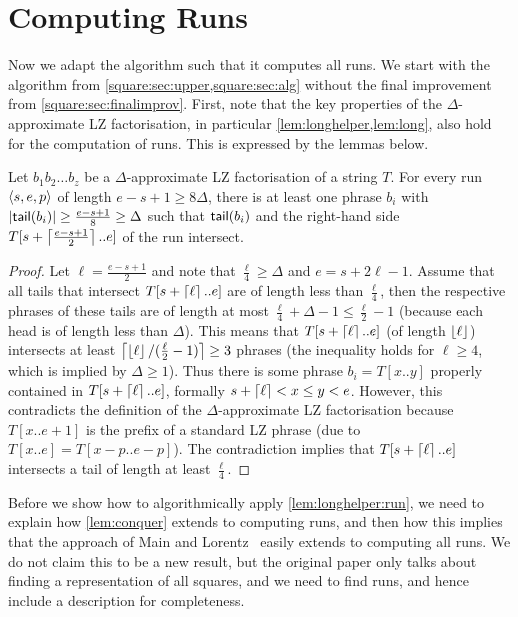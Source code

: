 \section{Computing Runs}\label{square:sec:runs}

Now we adapt the algorithm such that it computes all runs. We start with the algorithm from \cref{square:sec:upper,square:sec:alg} without the final improvement from \cref{square:sec:finalimprov}. First, note that the key properties of the $\Delta$-approximate LZ factorisation, in particular \cref{lem:longhelper,lem:long}, also hold for the computation of runs. This is expressed by the lemmas below.

\begin{lemma}
\label{lem:longhelper:run}
Let $b_{1}b_{2}\ldots b_{z}$ be a $\Delta$-approximate LZ factorisation of a string $T$. For every run $\left\langle s,e,p\right\rangle$ of length $e-s+1 \geq 8\Delta$, there is at least one phrase $b_i$ with $\left\lvert\textsf{tail}(b_i)\right\rvert \geq \frac {e-s+1} 8 \geq \Delta$ such that $\textsf{tail}(b_i)$ and the right-hand side $T[s + \left\lceil\frac{e - s + 1} 2\right\rceil..e]$ of the run intersect.
\end{lemma}
\begin{proof}
Let $\ell = \frac {e-s+1} 2$ and note that $\frac \ell 4 \geq \Delta$ and $e = s+2\ell - 1$. Assume that all tails that intersect $T[s + \left\lceil\ell\right\rceil..e]$ are of length less than $\frac \ell 4$, then the respective phrases of these tails are of length at most $\frac \ell 4 + \Delta - 1 \leq \frac \ell 2 - 1$ (because each head is of length less than $\Delta$). 
This means that $T[s + \left\lceil\ell\right\rceil..e]$ (of length $\left\lfloor\ell\right\rfloor$) intersects at least $\left\lceil\left\lfloor\ell\right\rfloor / (\frac \ell 2 - 1)\right\rceil \geq 3$ phrases (the inequality holds for $\ell \geq 4$, which is implied by $\Delta \geq 1$).
Thus there is some phrase $b_i = T[x..y]$ properly contained in $T[s+\left\lceil\ell\right\rceil..e]$, formally $s+\left\lceil\ell\right\rceil < x \leq y < e$.
However, this contradicts the definition of the $\Delta$-approximate LZ factorisation because $T[x..e+1]$ is the prefix of a standard LZ phrase (due to $T[x..e] = T[x - p..e-p]$). 
The contradiction implies that $T[s+\left\lceil\ell\right\rceil..e]$ intersects a tail of length at least $\frac \ell 4$.
\end{proof}

\noindent Before we show how to algorithmically apply \cref{lem:longhelper:run}, we need to explain how \cref{lem:conquer} extends
to computing runs, and then how this implies that the approach of Main and Lorentz~\cite{Main1984} easily extends to computing all runs.
We do not claim this to be a new result, but the original paper only talks about finding a representation of all squares, and
we need to find runs, and hence include a description for completeness.

